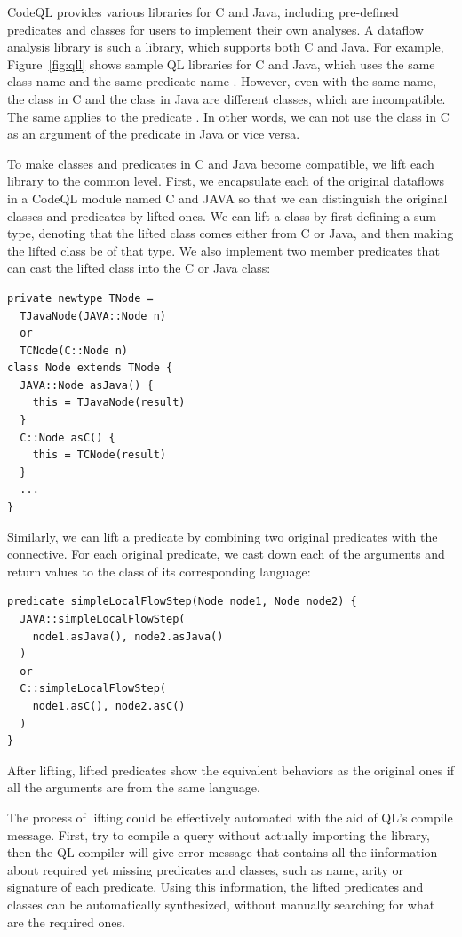 CodeQL provides various libraries for C and Java, including
pre-defined predicates and classes for users to implement their own analyses.
A dataflow analysis library is such a library, which supports both C and Java.
For example, Figure~\ref{fig:qll} shows sample QL libraries for C and Java,
which uses the same class name  and the same predicate
name .
However, even with the same name, the class  in C and the
class  in Java are different classes, which are incompatible.
The same applies to the predicate .
In other words, we can not use the class  in C as an
argument of the predicate  in Java or vice versa.

To make classes and predicates in C and Java become compatible,
we lift each library to the common level.
First, we encapsulate each of the original dataflows in a CodeQL
module named C and JAVA so that we can distinguish the original
classes and predicates by lifted ones.
We can lift a class by first defining a sum type, denoting that
the lifted class comes either from C or Java, and then making the
lifted class be of that type.  We also implement two member predicates
that can cast the lifted class into the C or Java class:
\begin{lstlisting}[style=codeql,xleftmargin=2.5em]
private newtype TNode =
  TJavaNode(JAVA::Node n)
  or
  TCNode(C::Node n)
class Node extends TNode {
  JAVA::Node asJava() {
    this = TJavaNode(result)
  }
  C::Node asC() {
    this = TCNode(result)
  }
  ...
}
\end{lstlisting}
Similarly, we can lift a predicate by combining two original predicates with
the  connective. For each original predicate, we cast down
each of the arguments and return values to the class of its corresponding language:
\begin{lstlisting}[style=codeql,xleftmargin=2.5em]
predicate simpleLocalFlowStep(Node node1, Node node2) {
  JAVA::simpleLocalFlowStep(
    node1.asJava(), node2.asJava()
  )
  or
  C::simpleLocalFlowStep(
    node1.asC(), node2.asC()
  )
}
\end{lstlisting}
After lifting, lifted predicates show the equivalent behaviors as the
original ones if all the arguments are from the same language.

The process of lifting could be effectively automated with the aid of
QL's compile message. First, try to compile a query without actually
importing the library, then the QL compiler will give error message
that contains all the iinformation about required yet missing predicates and classes,
such as name, arity or signature of each predicate. Using this information,
the lifted predicates and classes can be automatically synthesized, without
manually searching for what are the required ones.

